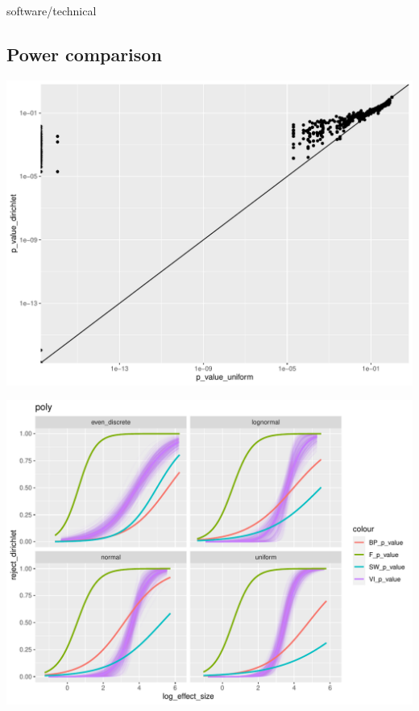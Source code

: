 \documentclass[]{interact}
\theoremstyle{plain}%
\theoremstyle{definition}
\theoremstyle{remark}
\begin{document}
software/technical

\hypertarget{power-comparison}{%
\subsection{Power comparison}\label{power-comparison}}

\includegraphics[width=1\linewidth]{paper_comparison_files/figure-latex/unnamed-chunk-6-1}

\includegraphics[width=1\linewidth]{paper_comparison_files/figure-latex/unnamed-chunk-7-1}
\end{document}
